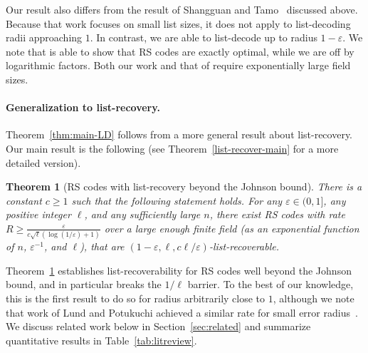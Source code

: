\documentclass[11pt]{article}
\newtheorem{theorem}{Theorem}[section]
\newcommand\black[1]{{\color{black} #1}}
\renewcommand{\epsilon}{\varepsilon}
\newcommand{\eps}{\epsilon}
\begin{document}
Our result also differs from the result of Shangguan and Tamo~\cite{shangguan2019combinatorial0} discussed above.  Because that work focuses on small list sizes, it does not apply to list-decoding radii approaching $1$.  In contrast, we are able to list-decode up to radius $1 - \eps$.  We note that \cite{shangguan2019combinatorial0} is able to show that RS codes are exactly optimal, while we are off by logarithmic factors.  Both our work and that of \cite{shangguan2019combinatorial0} require \black{exponentially} large field sizes.



\paragraph{Generalization to list-recovery.}
Theorem~\ref{thm:main-LD} follows from a more general result about list-recovery.
Our main result is the following (see Theorem~\ref{list-recover-main} for a more detailed version).

\begin{theorem}[RS codes with list-recovery beyond the Johnson bound]\label{thm:main}
 There is a constant $c\ge 1$ such that the following statement holds.
 For any $\epsilon\in(0,1]$, any positive integer $\ell$, and any sufficiently large $n$, there exist RS codes with rate $R\ge \frac{\varepsilon}{c\sqrt{\ell}(\log(1/\epsilon)+1)}$ over a large enough finite field (as an \black{exponential} function of $n$, $\epsilon^{-1}$, and $\ell$), that are $(1 - \eps, \ell, c\ell/ \eps)$-list-recoverable.
\end{theorem}



Theorem~\ref{thm:main} establishes list-recoverability for RS codes well beyond the Johnson bound,
and in particular breaks the $1/\ell$ barrier.
To the best of our knowledge, this is the first result to do so for radius arbitrarily close to $1$, although we note that work of Lund and Potukuchi achieved a similar rate for small error radius~\cite{LP20}.
We discuss related work below in Section~\ref{sec:related} and summarize quantitative results in Table~\ref{tab:litreview}.

%
\end{document}
